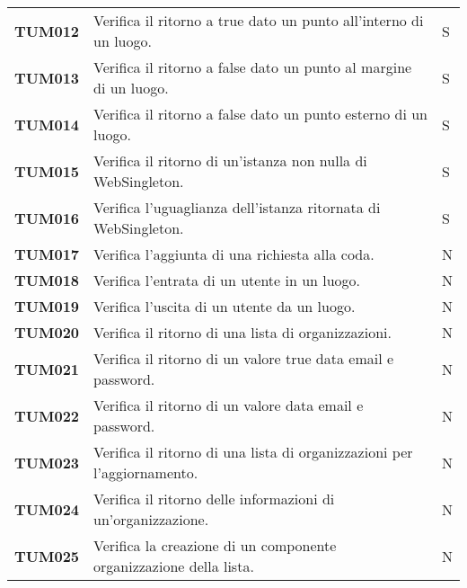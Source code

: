 \documentclass[../../piano-di-qualifica.tex]{subfiles}
\begin{document}
\begin{longtable}[H]{>{\centering\bfseries}m{3cm} >{}m{10cm} >{\centering\arraybackslash}m{3cm}}
  TUM012             & Verifica il ritorno a true dato un punto all'interno di un luogo. & S\\

  TUM013             & Verifica il ritorno a false dato un punto al margine di un luogo. & S\\

  TUM014             & Verifica il ritorno a false dato un punto esterno di un luogo. & S\\

  TUM015             & Verifica il ritorno di un'istanza non nulla di WebSingleton. & S\\

  TUM016             & Verifica l'uguaglianza dell'istanza ritornata di WebSingleton. & S\\

  TUM017             & Verifica l'aggiunta di una richiesta alla coda. & N\\ %

  TUM018             & Verifica l'entrata di un utente in un luogo. & N\\ %

  TUM019             & Verifica l'uscita di un utente da un luogo. & N\\ %

  TUM020             & Verifica il ritorno di una lista di organizzazioni. & N\\ %


  TUM021             & Verifica il ritorno di un valore true data email e password. & N\\ %

  TUM022             & Verifica il ritorno di un valore data email e password. & N\\ %

  TUM023             & Verifica il ritorno di una lista di organizzazioni per l'aggiornamento. & N\\ %

  TUM024             & Verifica il ritorno delle informazioni di un'organizzazione. & N\\ %

  TUM025             & Verifica la creazione di un componente organizzazione della lista. & N\\ %


\end{longtable}
\end{document}
